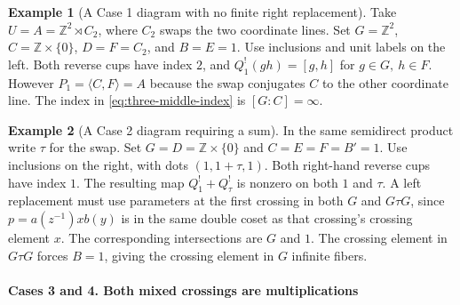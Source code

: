 \documentclass[11pt,a4paper]{article}
\numberwithin{equation}{section}
\theoremstyle{definition}
\newtheorem{example}{Example}[section]
\newcommand{\mixedThreeWires}[3]{%
  \draw[#1] (0,0)--(0,.26)
    .. controls (0,.73) and (1.4,.91) .. (1.4,1.45)
    --(1.4,1.79)
    .. controls (1.4,2.33) and (2.8,2.47) .. (2.8,3.01)
    --(2.8,4.8);
  \draw[#2] (1.4,0)--(1.4,.26)
    .. controls (1.4,.73) and (0,.91) .. (0,1.45)
    --(0,3.35)
    .. controls (0,3.89) and (1.4,4.03) .. (1.4,4.57)
    --(1.4,4.8);
  \draw[#3] (2.8,0)--(2.8,1.79)
    .. controls (2.8,2.33) and (1.4,2.47) .. (1.4,3.01)
    --(1.4,3.35)
    .. controls (1.4,3.89) and (0,4.03) .. (0,4.57)
    --(0,4.8);
}
\newcommand{\mixedThreeLeft}{%
  \foreach \x/\y/\i/\offset in {.7/.82875/1/-.43,2.1/2.4/2/.43,.7/3.96/3/-.43}{
    \fill (\x,\y) circle (1.9pt);
    \node[strandlabel] at ({\x+\offset},\y) {$x_{\i}$};
  }
  \node[region] at (.69,2.4) {$B$};
}
\newcommand{\mixedThreeRight}{%
  \foreach \x/\y/\i/\offset in {2.1/.82875/1/.43,.7/2.4/2/-.43,2.1/3.96/3/.43}{
    \fill (\x,\y) circle (1.9pt);
    \node[strandlabel] at ({\x+\offset},\y) {$y_{\i}$};
  }
  \node[region] at (2.11,2.4) {$B'$};
}
\newcommand{\mixedThreeBoundary}[7]{%
  \node[region] at (-.48,2.4) {$G$};
  \node[region] at (3.28,2.4) {$F$};
  \node[region] at (.70,.18) {$#1$};
  \node[region] at (2.10,.18) {$#2$};
  \node[region] at (.70,4.60) {$#3$};
  \node[region] at (2.10,4.60) {$#4$};
  \foreach \x/\lab in {#5} {\node[strandlabel] at (\x,-.35) {$\bar\lab$};}
  \foreach \x/\lab in {#6} {\node[strandlabel] at (\x,5.15) {$\bar\lab$};}
  \node[font=\normalsize] at (1.4,-.90) {Case #7};
}
\begin{document}
\begin{example}[A Case 1 diagram with no finite right replacement]\label{ex:case-one-no-finite-replacement}
Take \(U=A=\mathbb Z^2\rtimes C_2\), where \(C_2\) swaps the two
coordinate lines. Set \(G=\mathbb Z^2\), \(C=\mathbb Z\times\{0\}\),
\(D=F=C_2\), and \(B=E=1\). Use inclusions and unit labels on the left. Both
reverse cups have index \(2\), and \(Q_1^!(gh)=[g,h]\) for \(g\in G,\ h\in F\).
However \(P_1=\langle C,F\rangle=A\) because the swap conjugates \(C\) to the
other coordinate line. The index in \eqref{eq:three-middle-index} is
\([G:C]=\infty\).
\end{example}


\begin{example}[A Case 2 diagram requiring a sum]\label{ex:case-two-needs-a-sum}
In the same semidirect product write \(\tau\) for the swap.
Set \(G=D=\mathbb Z\times\{0\}\) and \(C=E=F=B'=1\). Use inclusions on
the right, with dots \((1,1+\tau,1)\). Both right-hand reverse cups
have index \(1\). The resulting map \(Q_1^!+Q_\tau^!\) is nonzero on
both \(1\) and \(\tau\). A left replacement must use parameters at the
first crossing in both \(G\) and \(G\tau G\), since \(p=a(z^{-1})x b(y)\) is
in the same double coset as that crossing's crossing element \(x\). The
corresponding intersections are \(G\) and \(1\). The crossing element in
\(G\tau G\) forces \(B=1\), giving the crossing element in \(G\) infinite fibers.
\end{example}

\paragraph{Cases 3 and 4. Both mixed crossings are multiplications}\mbox{}\par

\begin{center}
\end{center}
\end{document}
